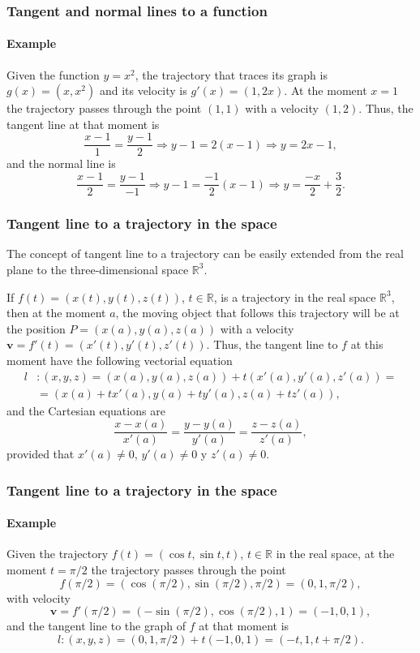 \begin{frame}
\frametitle{Tangent and normal lines to a function}
\framesubtitle{Example}
Given the function $y=x^2$, the trajectory that traces its graph is $g(x)=(x,x^2)$ and its velocity is 
$g'(x)=(1,2x)$. At the moment $x=1$ the trajectory passes through the point $(1,1)$ with a velocity $(1,2)$.
Thus, the tangent line at that moment is 
\[
\frac{x-1}{1} = \frac{y-1}{2} \Rightarrow y-1 = 2(x-1) \Rightarrow y = 2x-1,
\]
and the normal line is 
\[
\frac{x-1}{2} = \frac{y-1}{-1} \Rightarrow y-1 = \frac{-1}{2}(x-1) \Rightarrow y = \frac{-x}{2}+\frac{3}{2}.
\]
\begin{center}

\end{center}
\end{frame}


\begin{frame}
\frametitle{Tangent line to a trajectory in the space}
The concept of tangent line to a trajectory can be easily extended from the real plane to the three-dimensional space $\mathbb{R}^3$.

If $f(t)=(x(t),y(t),z(t))$, $t\in \mathbb{R}$, is a trajectory in the real space $\mathbb{R}^3$, then at the moment $a$, the moving object that follows this trajectory will be at the position $P=(x(a),y(a),z(a))$ with a velocity $\mathbf{v}=f'(t)=(x'(t),y'(t),z'(t))$.
Thus, the tangent line to $f$ at this moment have the following vectorial equation
\begin{align*}
l&: (x,y,z)=(x(a),y(a),z(a))+t(x'(a),y'(a),z'(a)) =\\
&= (x(a)+tx'(a),y(a)+ty'(a),z(a)+tz'(a)),
\end{align*}
and the Cartesian equations are 
\[
\frac{x-x(a)}{x'(a)}=\frac{y-y(a)}{y'(a)}=\frac{z-z(a)}{z'(a)},
\]
provided that $x'(a)\neq 0$, $y'(a)\neq 0$ y $z'(a)\neq 0$.
\end{frame}


\begin{frame}
\frametitle{Tangent line to a trajectory in the space}
\framesubtitle{Example}
Given the trajectory $f(t)=(\cos t, \sin t, t)$, $t\in \mathbb{R}$ in the real space, at the moment $t=\pi/2$ the trajectory passes through the point
\[
f(\pi/2)=(\cos(\pi/2),\sin(\pi/2),\pi/2)=(0,1,\pi/2),
\]
with velocity
\[
\mathbf{v}=f'(\pi/2)=(-\sin(\pi/2),\cos(\pi/2), 1)=(-1,0,1),
\] 
and the tangent line to the graph of $f$ at that moment is 
\[
l:(x,y,z)=(0,1,\pi/2)+t(-1,0,1) = (-t,1,t+\pi/2).
\]
\begin{center}

\end{center}
\end{frame}


